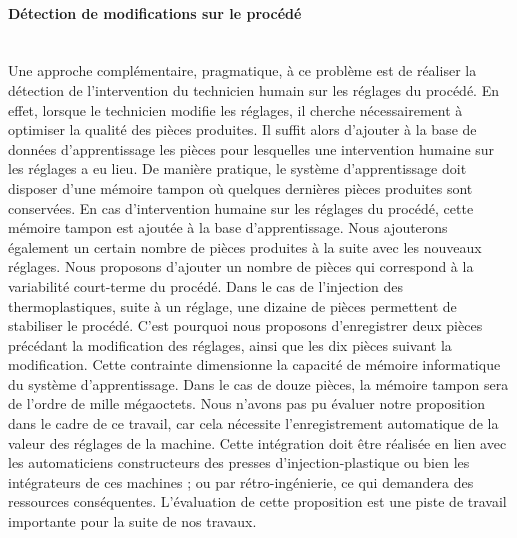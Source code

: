 \paragraph{Détection de modifications sur le procédé}\mbox{} \\
Une approche complémentaire, pragmatique, à ce problème est de réaliser la détection de l'intervention du technicien humain sur les réglages du procédé.
En effet, lorsque le technicien modifie les réglages, il cherche nécessairement à optimiser la qualité des pièces produites.
Il suffit alors d'ajouter à la base de données d'apprentissage les pièces pour lesquelles une intervention humaine sur les réglages a eu lieu.
De manière pratique, le système d'apprentissage doit disposer d'une mémoire tampon où quelques dernières pièces produites sont conservées.
En cas d'intervention humaine sur les réglages du procédé, cette mémoire tampon est ajoutée à la base d'apprentissage.
Nous ajouterons également un certain nombre de pièces produites à la suite avec les nouveaux réglages.
Nous proposons d'ajouter un nombre de pièces qui correspond à la variabilité court-terme du procédé.
Dans le cas de l'injection des thermoplastiques, suite à un réglage, une dizaine de pièces permettent de stabiliser le procédé.
C'est pourquoi nous proposons d'enregistrer deux pièces précédant la modification des réglages, ainsi que les dix pièces suivant la modification.
Cette contrainte dimensionne la capacité de mémoire informatique du système d'apprentissage.
Dans le cas de douze pièces, la mémoire tampon sera de l'ordre de mille mégaoctets.
Nous n'avons pas pu évaluer notre proposition dans le cadre de ce travail, car cela nécessite l'enregistrement automatique de la valeur des réglages de la machine.
Cette intégration doit être réalisée en lien avec les automaticiens constructeurs des presses d'injection-plastique ou bien les intégrateurs de ces machines ; ou par rétro-ingénierie, ce qui demandera des ressources conséquentes.
L'évaluation de cette proposition est une piste de travail importante pour la suite de nos travaux.

\vfill
\newpage
